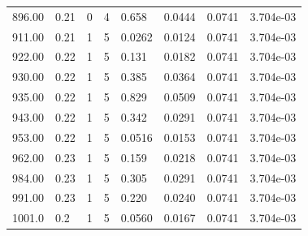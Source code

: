 \documentclass[preview]{standalone}
\begin{document}
{{{{\begin{tabular}{L{1.2cm}C{1.2cm} C{0.3cm}C{0.5cm} C{1.4cm}C{1.4cm} C{1.4cm}C{1.4cm}}
  896.00  &  0.21  & 0     &  4 &  0.658  & 0.0444  & 0.0741 &  3.704e-03   \\ 
  911.00  &  0.21  & 1     &  5 &  0.0262  & 0.0124  & 0.0741 &  3.704e-03   \\ 
  922.00  &  0.22  & 1     &  5 &  0.131  & 0.0182  & 0.0741 &  3.704e-03   \\ 
  930.00  &  0.22  & 1     &  5 &  0.385  & 0.0364  & 0.0741 &  3.704e-03   \\ 
  935.00  &  0.22  & 1     &  5 &  0.829  & 0.0509  & 0.0741 &  3.704e-03   \\ 
  943.00  &  0.22  & 1     &  5 &  0.342  & 0.0291  & 0.0741 &  3.704e-03   \\ 
  953.00  &  0.22  & 1     &  5 &  0.0516  & 0.0153  & 0.0741 &  3.704e-03   \\ 
  962.00  &  0.23  & 1     &  5 &  0.159  & 0.0218  & 0.0741 &  3.704e-03   \\ 
  984.00  &  0.23  & 1     &  5 &  0.305  & 0.0291  & 0.0741 &  3.704e-03   \\ 
  991.00  &  0.23  & 1     &  5 &  0.220  & 0.0240  & 0.0741 &  3.704e-03   \\ 
  1001.0  &   0.2  & 1     &  5 &  0.0560  & 0.0167  & 0.0741 &  3.704e-03   \\ 
\hline 
\end{tabular} 

}}}}
\end{document}
